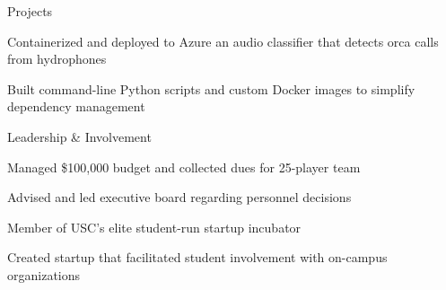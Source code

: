 \documentclass{resume} %
\begin{document}
    \begin{rSection}{Projects}

            \begin{rList}
                \item Containerized and deployed to Azure an audio classifier that
                    detects orca calls from hydrophones
            \end{rList}
        \vspace{0.5em}


            \begin{rList}
                \item Built command-line Python scripts and custom Docker images to simplify
                    dependency management
            \end{rList}
        \vspace{0.5em}

    \end{rSection}


    \begin{rSection}{Leadership \& Involvement}

        \company{\uscih}{\la}
                \begin{rList}
                    \item Managed \$100,000 budget and collected dues for 25-player team
                    \item Advised and led executive board regarding personnel decisions
                \end{rList}
        \vspace{0.5em}


        \company{\lavalab}{\la}
                \begin{rList}
                    \item Member of USC's elite student-run startup incubator
                    \item Created startup that facilitated student involvement with on-campus
                        organizations
                \end{rList}

    \end{rSection}

\end{document}
